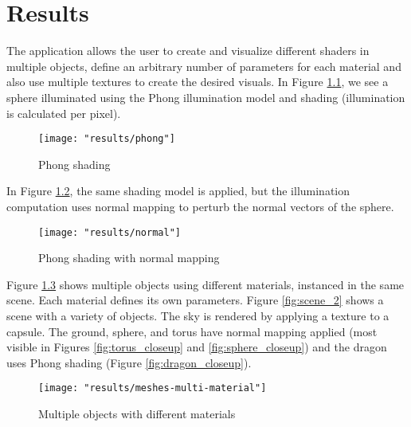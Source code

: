 \chapter{Results}
The application allows the user to create and visualize different shaders in multiple objects, define an arbitrary number of parameters for each material and also use multiple textures to create the desired visuals. In Figure \ref{fig:phong_sphere}, we see a sphere illuminated using the Phong illumination model and shading (illumination is calculated per pixel).

\begin{figure}[ht]
    \caption{Phong shading}
    \begin{center}
        \texttt{[image: "results/phong"]}
    \end{center}
    \label{fig:phong_sphere}
\end{figure}

In Figure \ref{fig:phong_normal_sphere}, the same shading model is applied, but the illumination computation uses normal mapping to perturb the normal vectors of the sphere.

\begin{figure}[ht]
    \caption{Phong shading with normal mapping}
    \begin{center}
        \texttt{[image: "results/normal"]}
    \end{center}
    \label{fig:phong_normal_sphere}
\end{figure}

Figure \ref{fig:scene_1} shows multiple objects using different materials, instanced in the same scene. Each material defines its own parameters. Figure \ref{fig:scene_2} shows a scene with a variety of objects. The sky is rendered by applying a texture to a capsule. The ground, sphere, and torus have normal mapping applied (most visible in Figures \ref{fig:torus_closeup} and \ref{fig:sphere_closeup}) and the dragon uses Phong shading (Figure \ref{fig:dragon_closeup}).

\begin{figure}[ht]
    \caption{Multiple objects with different materials}
    \begin{center}
        \texttt{[image: "results/meshes-multi-material"]}
    \end{center}
    \label{fig:scene_1}
\end{figure}

